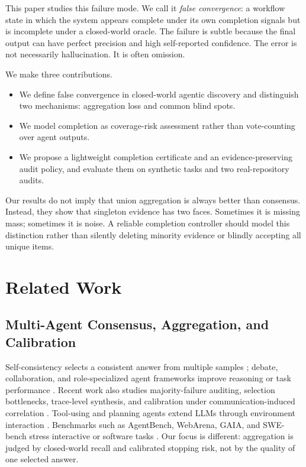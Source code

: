 \documentclass[letterpaper]{article}
\begin{document}
This paper studies this failure mode. We call it \emph{false convergence}: a
workflow state in which the system appears complete under its own completion
signals but is incomplete under a closed-world oracle. The failure is subtle
because the final output can have perfect precision and high self-reported
confidence. The error is not necessarily hallucination. It is often omission.

We make three contributions.

\begin{itemize}
    \item We define false convergence in closed-world agentic discovery and
    distinguish two mechanisms: aggregation loss and common blind spots.
    \item We model completion as coverage-risk assessment rather than
    vote-counting over agent outputs.
    \item We propose a lightweight completion certificate and an
    evidence-preserving audit policy, and evaluate them on synthetic tasks and
    two real-repository audits.
\end{itemize}

Our results do not imply that union aggregation is always better than consensus.
Instead, they show that singleton evidence has two faces. Sometimes it is
missing mass; sometimes it is noise. A reliable completion controller should
model this distinction rather than silently deleting minority evidence or
blindly accepting all unique items.

\section{Related Work}

\subsection{Multi-Agent Consensus, Aggregation, and Calibration}

Self-consistency selects a consistent answer from multiple samples
\citep{wang2022selfconsistency}; debate, collaboration, and role-specialized
agent frameworks improve reasoning or task performance
\citep{du2023debate,chan2023chateval,wu2023autogen,chen2023agentverse,
hong2023metagpt,li2023camel,zhang2024proagent}. Recent work also studies
majority-failure auditing, selection bottlenecks, trace-level synthesis, and
calibration under communication-induced correlation
\citep{yang2026agentauditor,maryanskyy2026agentsdisagree,
fadnavis2026beyondconsensus,huang2026cagecal}. Tool-using and
planning agents extend LLMs through environment interaction
\citep{yao2023react,schick2023toolformer,qin2023toolllm,yao2023tot,
wang2023voyager}. Benchmarks such as
AgentBench, WebArena, GAIA, and SWE-bench stress interactive or software tasks
\citep{liu2023agentbench,zhou2023webarena,mialon2023gaia,jimenez2023swebench}.
Our focus is different: aggregation is judged by closed-world recall and
calibrated stopping risk, not by the quality of one selected answer.
\end{document}
